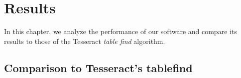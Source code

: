 \chapter{Results}

In this chapter, we analyze the performance of our software and compare its results to those of the Tesseract \emph{table find} algorithm.

\section{}


\section{Comparison to Tesseract's tablefind}